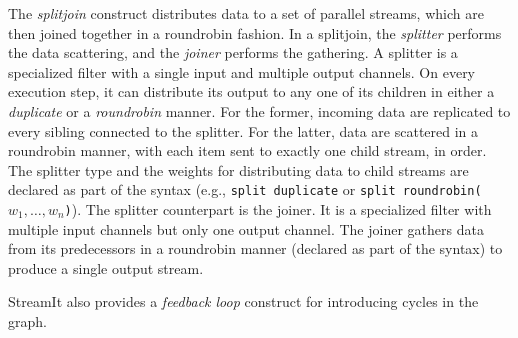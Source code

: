The {\it splitjoin} construct distributes data to a set of parallel
streams, which are then joined together in a roundrobin fashion.  In
a splitjoin, the {\it splitter} performs the data scattering, and the
{\it joiner} performs the gathering. A splitter is a specialized
filter with a single input and  multiple output channels. On 
every execution step, it can distribute its output to any one of
its children in either a {\it duplicate} or a {\it roundrobin}
manner. For the former, incoming data are replicated to every
sibling connected to the splitter. For the latter, data are scattered
in a roundrobin manner, with each item sent to exactly one child
stream, in order.  The splitter type and the weights for distributing data to
child streams are declared as part of the syntax (e.g., \texttt{split
duplicate} or \texttt{split roundrobin($w_1,\ldots,w_n$)}). The
splitter counterpart is the joiner. It is a specialized filter with  
multiple input channels but only one output channel. The joiner
gathers data from its predecessors in a roundrobin manner (declared
as part of the syntax) to produce a single output stream.

StreamIt also provides a {\it feedback loop} construct for introducing
cycles in the graph.


